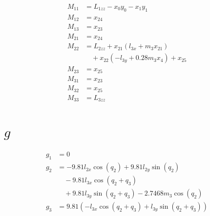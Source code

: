 \documentclass[11pt]{article}
\begin{document}
\begin{align*}
M_{11} &= L_{1zz} - x_{0} y_{0} - x_{1} y_{1} \\
M_{12} &= x_{24} \\
M_{13} &= x_{23} \\
M_{21} &= x_{24} \\
M_{22} &= L_{2zz} + x_{21} \left(l_{3x} + m_{3} x_{21}\right) \\
&\quad + x_{22} \left(- l_{3y} + 0.28 m_{3} x_{4}\right) + x_{25} \\
M_{23} &= x_{25} \\
M_{31} &= x_{23} \\
M_{32} &= x_{25} \\
M_{33} &= L_{3zz}
\end{align*}


\section*{$g$}

\begin{align*}
g_{1} &= 0 \\
g_{2} &= - 9.81 l_{2x} \cos{\left(q_{2} \right)} + 9.81 l_{2y} \sin{\left(q_{2} \right)} \\
&\quad - 9.81 l_{3x} \cos{\left(q_{2} + q_{3} \right)} \\
&\quad + 9.81 l_{3y} \sin{\left(q_{2} + q_{3} \right)} - 2.7468 m_{3} \cos{\left(q_{2} \right)} \\
g_{3} &= 9.81 \left(- l_{3x} \cos{\left(q_{2} + q_{3} \right)} + l_{3y} \sin{\left(q_{2} + q_{3} \right)}\right)
\end{align*}
\end{document}
